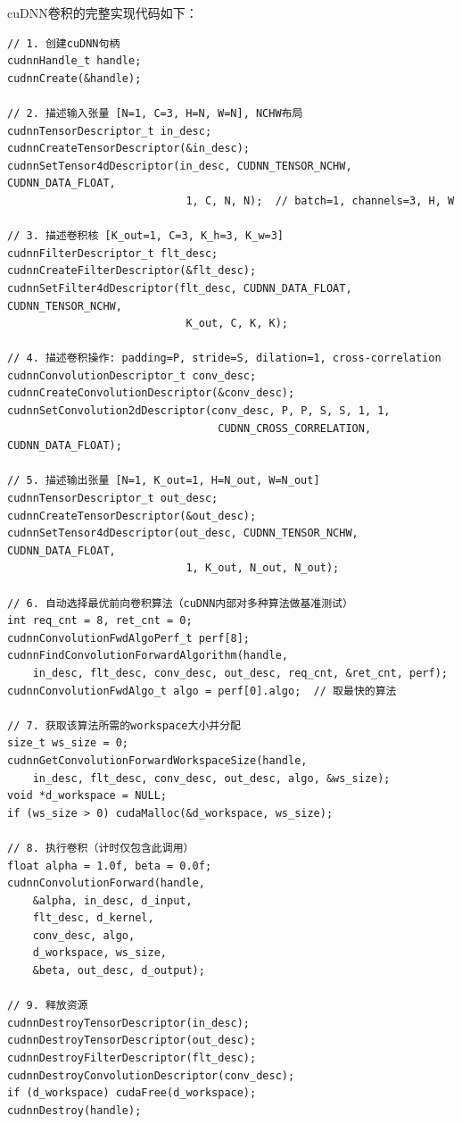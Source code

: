 \documentclass{SYSUReport}
\begin{document}
cuDNN卷积的完整实现代码如下：
\begin{lstlisting}[style=cuda_cpp, caption={cuDNN卷积实现}]
// 1. 创建cuDNN句柄
cudnnHandle_t handle;
cudnnCreate(&handle);

// 2. 描述输入张量 [N=1, C=3, H=N, W=N], NCHW布局
cudnnTensorDescriptor_t in_desc;
cudnnCreateTensorDescriptor(&in_desc);
cudnnSetTensor4dDescriptor(in_desc, CUDNN_TENSOR_NCHW, CUDNN_DATA_FLOAT,
                            1, C, N, N);  // batch=1, channels=3, H, W

// 3. 描述卷积核 [K_out=1, C=3, K_h=3, K_w=3]
cudnnFilterDescriptor_t flt_desc;
cudnnCreateFilterDescriptor(&flt_desc);
cudnnSetFilter4dDescriptor(flt_desc, CUDNN_DATA_FLOAT, CUDNN_TENSOR_NCHW,
                            K_out, C, K, K);

// 4. 描述卷积操作: padding=P, stride=S, dilation=1, cross-correlation
cudnnConvolutionDescriptor_t conv_desc;
cudnnCreateConvolutionDescriptor(&conv_desc);
cudnnSetConvolution2dDescriptor(conv_desc, P, P, S, S, 1, 1,
                                 CUDNN_CROSS_CORRELATION, CUDNN_DATA_FLOAT);

// 5. 描述输出张量 [N=1, K_out=1, H=N_out, W=N_out]
cudnnTensorDescriptor_t out_desc;
cudnnCreateTensorDescriptor(&out_desc);
cudnnSetTensor4dDescriptor(out_desc, CUDNN_TENSOR_NCHW, CUDNN_DATA_FLOAT,
                            1, K_out, N_out, N_out);

// 6. 自动选择最优前向卷积算法（cuDNN内部对多种算法做基准测试）
int req_cnt = 8, ret_cnt = 0;
cudnnConvolutionFwdAlgoPerf_t perf[8];
cudnnFindConvolutionForwardAlgorithm(handle,
    in_desc, flt_desc, conv_desc, out_desc, req_cnt, &ret_cnt, perf);
cudnnConvolutionFwdAlgo_t algo = perf[0].algo;  // 取最快的算法

// 7. 获取该算法所需的workspace大小并分配
size_t ws_size = 0;
cudnnGetConvolutionForwardWorkspaceSize(handle,
    in_desc, flt_desc, conv_desc, out_desc, algo, &ws_size);
void *d_workspace = NULL;
if (ws_size > 0) cudaMalloc(&d_workspace, ws_size);

// 8. 执行卷积（计时仅包含此调用）
float alpha = 1.0f, beta = 0.0f;
cudnnConvolutionForward(handle,
    &alpha, in_desc, d_input,
    flt_desc, d_kernel,
    conv_desc, algo,
    d_workspace, ws_size,
    &beta, out_desc, d_output);

// 9. 释放资源
cudnnDestroyTensorDescriptor(in_desc);
cudnnDestroyTensorDescriptor(out_desc);
cudnnDestroyFilterDescriptor(flt_desc);
cudnnDestroyConvolutionDescriptor(conv_desc);
if (d_workspace) cudaFree(d_workspace);
cudnnDestroy(handle);
\end{lstlisting}
\end{document}
